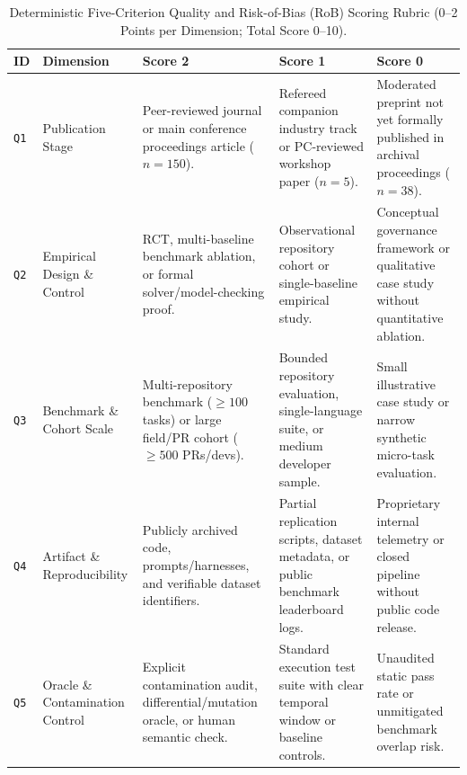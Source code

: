 \documentclass[10pt,twocolumn,a4paper]{article}
\begin{document}
\begin{table}[t!]
\centering
\caption{Deterministic Five-Criterion Quality and Risk-of-Bias (RoB) Scoring Rubric (0--2 Points per Dimension; Total Score 0--10).}
\label{tab:rob_rubric}
\scriptsize
\setlength{\tabcolsep}{3.8pt}
\begin{tabularx}{\textwidth}{l >{\raggedright\arraybackslash}p{2.55cm} X X X}
\toprule
\textbf{ID} & \textbf{Dimension} & \textbf{Score 2} & \textbf{Score 1} & \textbf{Score 0} \\
\midrule
\texttt{Q1} & Publication Stage & Peer-reviewed journal or main conference proceedings article ($n=150$). & Refereed companion industry track or PC-reviewed workshop paper ($n=5$). & Moderated preprint not yet formally published in archival proceedings ($n=38$). \\
\texttt{Q2} & Empirical Design \& Control & RCT, multi-baseline benchmark ablation, or formal solver/model-checking proof. & Observational repository cohort or single-baseline empirical study. & Conceptual governance framework or qualitative case study without quantitative ablation. \\
\texttt{Q3} & Benchmark \& Cohort Scale & Multi-repository benchmark ($\ge 100$ tasks) or large field/PR cohort ($\ge 500$ PRs/devs). & Bounded repository evaluation, single-language suite, or medium developer sample. & Small illustrative case study or narrow synthetic micro-task evaluation. \\
\texttt{Q4} & Artifact \& Reproducibility & Publicly archived code, prompts/harnesses, and verifiable dataset identifiers. & Partial replication scripts, dataset metadata, or public benchmark leaderboard logs. & Proprietary internal telemetry or closed pipeline without public code release. \\
\texttt{Q5} & Oracle \& Contamination Control & Explicit contamination audit, differential/mutation oracle, or human semantic check. & Standard execution test suite with clear temporal window or baseline controls. & Unaudited static pass rate or unmitigated benchmark overlap risk. \\
\bottomrule
\end{tabularx}
\end{table}
\end{document}

